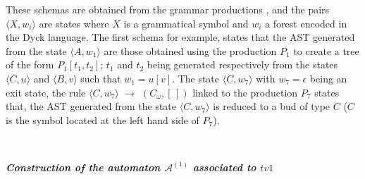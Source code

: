 These schemas are obtained from the grammar productions \cite{badouelTchoupeCmcs}, and the pairs $\langle X,w_{i} \rangle$ are states where $X$ is a grammatical symbol and $w_{i}$ a forest encoded in the Dyck language. The first schema for example, states that the AST generated from the state $\langle A,w_{1} \rangle$ are those obtained using the production $P_{1}$ to create a tree of the form $P_{1}[t_{1}, t_{2}]$; $t_{1}$ and $t_{2}$ being generated respectively from the states $\langle C,u \rangle$ and $\langle B,v \rangle$ such that $w_{1}=u[v]$. The state $\langle C,w_{7} \rangle$ with $w_{7}=\epsilon$ being an exit state, the rule $\langle C,w_{7} \rangle$ $\longrightarrow$ $(C_{\omega}, [\,])$ linked to the production $P_{7}$ states that, the AST generated from the state $\langle C,w_{7} \rangle$ is reduced to a bud of type $C$ ($C$ is the symbol located at the left hand side of $P_{7}$).


~

\noindent\textbf{\textit{Construction of the automaton $\mathcal{A}^{(1)}$ associated to $tv1$}}

